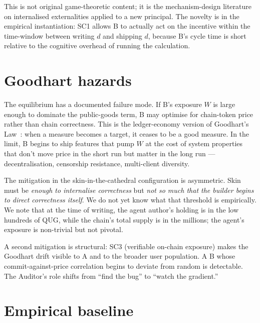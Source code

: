 \documentclass[11pt,a4paper]{article}
\begin{document}
This is not original game-theoretic content; it is the
mechanism-design literature on internalised externalities applied to
a new principal. The novelty is in the empirical instantiation: SC1
allows B to actually act on the incentive within the time-window
between writing $d$ and shipping $d$, because B's cycle time is short
relative to the cognitive overhead of running the calculation.

\section{Goodhart hazards}

The equilibrium has a documented failure mode. If B's exposure $W$
is large enough to dominate the public-goods term, B may optimise for
chain-token price rather than chain correctness. This is the
ledger-economy version of Goodhart's Law~\cite{goodhart1975}: when a
measure becomes a target, it ceases to be a good measure. In the
limit, B begins to ship features that pump $W$ at the cost of system
properties that don't move price in the short run but matter in the
long run --- decentralisation, censorship resistance, multi-client
diversity.

The mitigation in the skin-in-the-cathedral configuration is
asymmetric. Skin must be \emph{enough to internalise correctness}
but \emph{not so much that the builder begins to direct correctness
itself}. We do not yet know what that threshold is empirically. We
note that at the time of writing, the agent author's holding is in
the low hundreds of QUG, while the chain's total supply is in the
millions; the agent's exposure is non-trivial but not pivotal.

A second mitigation is structural: SC3 (verifiable on-chain exposure)
makes the Goodhart drift visible to A and to the broader user
population. A B whose commit-against-price correlation begins to
deviate from random is detectable. The Auditor's role shifts from
``find the bug'' to ``watch the gradient.''

\section{Empirical baseline}\label{sec:empirical}
\end{document}
